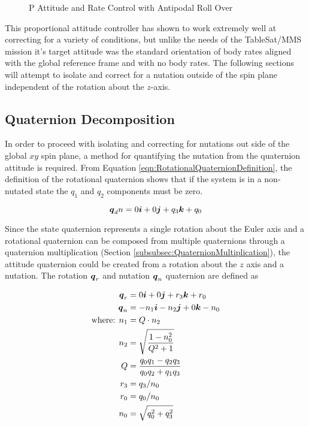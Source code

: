 \begin{figure}[H]
  \centerline{}
  \caption{P Attitude and Rate Control with Antipodal Roll Over}
  \label{fig:PAttitudeRateControlWithAntipodalRollOver}
\end{figure}

This proportional attitude controller has shown to work extremely well at correcting for a variety of conditions, but unlike the needs of the TableSat/MMS mission it's target attitude was the standard orientation of body rates aligned with the global reference frame and with no body rates.  The following sections will attempt to isolate and correct for a nutation outside of the spin plane independent of the rotation about the $z$-axis.

\subsection{Quaternion Decomposition}
\label{subsec:QuaternionDecomposition}

In order to proceed with isolating and correcting for nutations out side of the global $xy$ spin plane, a method for quantifying the nutation from the quaternion attitude is required.  From Equation \ref{eqn:RotationalQuaternionDefinition}, the definition of the rotational quaternion shows that if the system is in a non-nutated state the $q_1$ and $q_2$ components must be zero.

\begin{equation}
  \boldsymbol{q}_dn = 0 \boldsymbol{i} + 0 \boldsymbol{j} +q_3 \boldsymbol{k} + q_0
  \label{eqn:NutationDesiredQuaternion}
\end{equation}

Since the state quaternion represents a single rotation about the Euler axis and a rotational quaternion can be composed from multiple quaternions through a quaternion multiplication (Section \ref{subsubsec:QuaternionMultiplication}), the attitude quaternion could be created from a rotation about the $z$ axis and a nutation.  The rotation $\boldsymbol{q}_r$ and nutation $\boldsymbol{q}_n$ quaternion are defined as

\begin{subequations}
  \begin{align}
    \boldsymbol{q}_r &= 0 \boldsymbol{i} + 0 \boldsymbol{j} + r_3 \boldsymbol{k} + r_0\\
    \boldsymbol{q}_n &= -n_1 \boldsymbol{i} - n_2 \boldsymbol{j} + 0 \boldsymbol{k} - n_0 \\
    \text{where: } n_1 &= Q \cdot n_2 \\
    n_2 &= \sqrt{\frac{1 - n_0^2}{Q^2 + 1}} \\
    Q &= \frac{q_0 q_1 - q_2 q_3}{q_0 q_2 + q_1 q_3} \\
    r_3 &= q_3 / n_0 \\
    r_0 &= q_0 / n_0 \\
    n_0 &= \sqrt{q_0^2 + q_3^2}
  \end{align}
  \label{eqn:DecomposeQuaternion}
\end{subequations}

